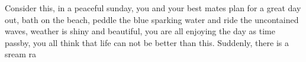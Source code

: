 Consider this, in a peaceful sunday, you and your best mates plan for a great day out, bath on the beach, peddle the blue sparking water and ride the uncontained waves, weather is shiny and beautiful, you are all enjoying the day as time passby, you all think that life can not be better than this. Suddenly, there is a sream ra